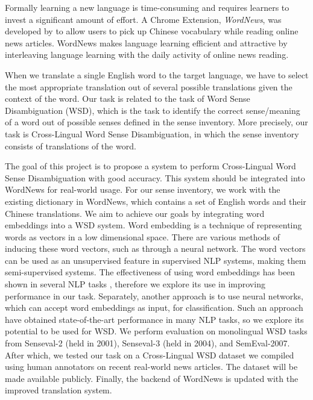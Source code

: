 \documentclass[11pt]{article}
\begin{document}
Formally learning a new language is time-consuming and requires learners to invest a significant
amount of effort. A Chrome Extension, {\it WordNews}, was developed by \cite{tao2014} to allow users to pick up Chinese vocabulary while reading online news articles. WordNews makes language learning efficient and attractive by interleaving language
learning with the daily activity of online news reading. 

	
	When we translate a single English word to the target language, we have to select the most appropriate translation out of several possible translations given the context of the word. 
	Our task is related to the task of Word Sense Disambiguation (WSD), which is the task to identify the correct sense/meaning of a word out of possible senses defined in the sense inventory.
	More precisely, our task is Cross-Lingual Word Sense Disambiguation, in which the sense inventory consists of translations of the word.


The goal of this project is to propose a system to perform Cross-Lingual Word Sense Disambiguation with good accuracy. This system should be integrated into WordNews for real-world usage. 
For our sense inventory, we work with the existing dictionary in WordNews, which contains a set of English words and their Chinese translations. We aim to achieve our goals by integrating word embeddings into a WSD system. 
Word embedding is a technique of representing words as vectors in a low dimensional space. There are various methods of inducing these word vectors, such as through a neural network. The word vectors can be used as an unsupervised feature in supervised NLP systems, making them semi-supervised systems. The effectiveness of using word embeddings has been shown in several NLP tasks \cite{Turian10wordrepresentations}, therefore we explore its use in improving performance in our task. Separately, another approach is to use neural networks, which can accept word embeddings as input, for classification. Such an approach have obtained state-of-the-art performance in many NLP tasks, so we explore its potential to be used for WSD. We perform evaluation on monolingual WSD tasks from Senseval-2 (held in 2001), Senseval-3 (held in 2004), and SemEval-2007. After which, we tested our task on a Cross-Lingual WSD dataset we compiled using human annotators on recent real-world news articles. The dataset will be made available publicly.  Finally, the backend of WordNews is updated with the improved translation system. 
\end{document}
